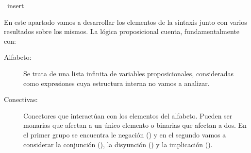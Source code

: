 %
\begin{isabellebody}%
%
%
\isadelimtheory
%
\endisadelimtheory
%
\isatagtheory
%
\endisatagtheory
{\isafoldtheory}%
%
\isadelimtheory
%
\endisadelimtheory
%
\isadelimdocument
%
\endisadelimdocument
%
\isatagdocument
%
\isamarkuptrue%
%
\endisatagdocument
{\isafolddocument}%
%
\isadelimdocument
%
\endisadelimdocument
{}\isamarkupfalse%
\ insert\ {\isacharparenleft}{\isachardoublequoteopen}{\isacharunderscore}\ {\isasymtriangleright}\ {\isacharunderscore}{\isachardoublequoteclose}\ {\isacharbrackleft}{}{}{\isacharcomma}{}{}{\isacharbrackright}\ {}{}{\isacharparenright}%
\begin{isamarkuptext}%
En este apartado vamos a desarrollar los elementos de la sintaxis junto con varios resultados 
sobre los mismos. La lógica proposicional cuenta, fundamentalmente con:
\begin{description}
    \item[Alfabeto:] Se trata de una lista infinita de variables proposicionales, consideradas como 
expresiones cuya estructura interna no vamos a analizar.
    \item[Conectivas:] Conectores que interactúan con los elementos del alfabeto. Pueden ser 
    monarias que afectan a un único elemento o binarias que afectan a dos. En el primer grupo se 
    encuentra le negación (\isa{{\isasymnot}}) y en el segundo vamos a considerar la conjunción (\isa{{\isasymand}}), la 
    disyunción (\isa{{\isasymor}}) y la implicación (\isa{{\isasymlongrightarrow}}).
\end{description}


\end{isamarkuptext}
\end{isabellebody}

